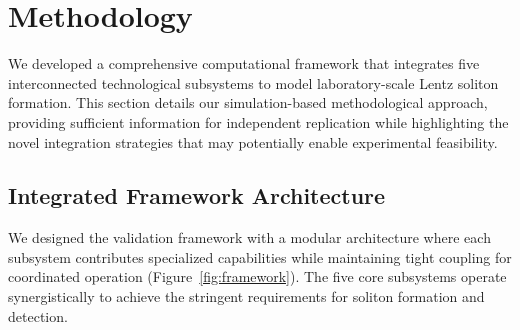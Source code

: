 \documentclass[12pt,a4paper]{article}
\begin{document}
\section{Methodology}

We developed a comprehensive computational framework that integrates five interconnected technological subsystems to model laboratory-scale Lentz soliton formation. This section details our simulation-based methodological approach, providing sufficient information for independent replication while highlighting the novel integration strategies that may potentially enable experimental feasibility.

\subsection{Integrated Framework Architecture}

We designed the validation framework with a modular architecture where each subsystem contributes specialized capabilities while maintaining tight coupling for coordinated operation (Figure~\ref{fig:framework}). The five core subsystems operate synergistically to achieve the stringent requirements for soliton formation and detection.
\end{document}
